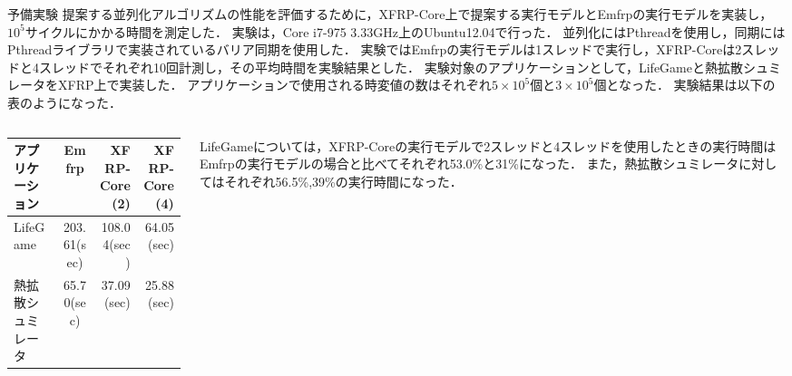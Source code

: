 \documentclass[dvipdfmx,final,t,10pt]{beamer}
\begin{document}
\begin{frame}[fragile]
    \begin{block}{予備実験}
        \vskip 0.2cm
            提案する並列化アルゴリズムの性能を評価するために，XFRP-Core上で提案する実行モデルとEmfrpの実行モデルを実装し，$10^5$サイクルにかかる時間を測定した．
            実験は，Core i7-975 3.33GHz上のUbuntu12.04で行った．
            並列化にはPthreadを使用し，同期にはPthreadライブラリで実装されているバリア同期を使用した．
            実験ではEmfrpの実行モデルは1スレッドで実行し，XFRP-Coreは2スレッドと4スレッドでそれぞれ10回計測し，その平均時間を実験結果とした．
            実験対象のアプリケーションとして，LifeGameと熱拡散シュミレータをXFRP上で実装した．
            アプリケーションで使用される時変値の数はそれぞれ$5\times10^5$個と$3\times10^5$個となった．
            実験結果は以下の表のようになった．
        \begin{columns}
            \begin{column}{0.55\textwidth}
                \vskip -0.3cm
                \begin{table}
                    \begin{tabular}{|l|c|r|r|} \hline
                        アプリケーション & Emfrp & XFRP-Core(2) & XFRP-Core(4) \\ \hline
                        LifeGame & 203.61(sec) & 108.04(sec) & 64.05(sec) \\ \hline
                        熱拡散シュミレータ & 65.70(sec) & 37.09(sec) & 25.88(sec) \\ \hline
                    \end{tabular}
                \end{table}
            \end{column}
            \begin{column}{0.4\textwidth}
                LifeGameについては，XFRP-Coreの実行モデルで2スレッドと4スレッドを使用したときの実行時間はEmfrpの実行モデルの場合と比べてそれぞれ53.0\%と31\%になった．
                また，熱拡散シュミレータに対してはそれぞれ56.5\%,39\%の実行時間になった．
            \end{column}
        \end{columns} 
        \vskip -0.2cm
    \end{block}
\end{frame}
\end{document}
